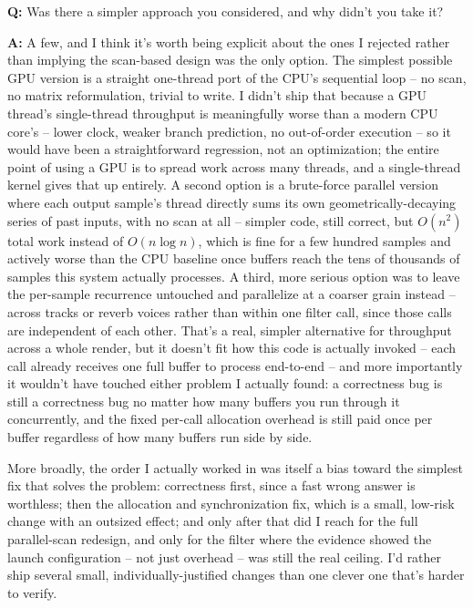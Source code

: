 \documentclass[11pt]{article}
\newcommand{\Q}[1]{\vspace{0.6em}\noindent\textbf{\textcolor{blue!60!black}{Q:}} #1\par}
\newcommand{\A}[1]{\noindent\textbf{A:} #1\par}
\begin{document}
\Q{Was there a simpler approach you considered, and why didn't you take it?}
\A{A few, and I think it's worth being explicit about the ones I rejected rather than implying the scan-based design was the only option. The simplest possible GPU version is a straight one-thread port of the CPU's sequential loop -- no scan, no matrix reformulation, trivial to write. I didn't ship that because a GPU thread's single-thread throughput is meaningfully worse than a modern CPU core's -- lower clock, weaker branch prediction, no out-of-order execution -- so it would have been a straightforward regression, not an optimization; the entire point of using a GPU is to spread work across many threads, and a single-thread kernel gives that up entirely. A second option is a brute-force parallel version where each output sample's thread directly sums its own geometrically-decaying series of past inputs, with no scan at all -- simpler code, still correct, but $O(n^2)$ total work instead of $O(n\log n)$, which is fine for a few hundred samples and actively worse than the CPU baseline once buffers reach the tens of thousands of samples this system actually processes. A third, more serious option was to leave the per-sample recurrence untouched and parallelize at a coarser grain instead -- across tracks or reverb voices rather than within one filter call, since those calls are independent of each other. That's a real, simpler alternative for throughput across a whole render, but it doesn't fit how this code is actually invoked -- each call already receives one full buffer to process end-to-end -- and more importantly it wouldn't have touched either problem I actually found: a correctness bug is still a correctness bug no matter how many buffers you run through it concurrently, and the fixed per-call allocation overhead is still paid once per buffer regardless of how many buffers run side by side.

More broadly, the order I actually worked in was itself a bias toward the simplest fix that solves the problem: correctness first, since a fast wrong answer is worthless; then the allocation and synchronization fix, which is a small, low-risk change with an outsized effect; and only after that did I reach for the full parallel-scan redesign, and only for the filter where the evidence showed the launch configuration -- not just overhead -- was still the real ceiling. I'd rather ship several small, individually-justified changes than one clever one that's harder to verify.}
\end{document}
